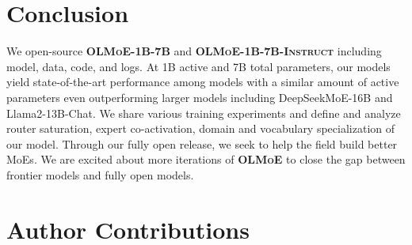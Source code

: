 \documentclass{article}
\newcommand{\model}{\textbf{\textsc{OLMoE}}}
\newcommand{\modelsmall}{\textbf{\textsc{OLMoE-1B-7B}}}
\newcommand{\modelsmalldpo}{\textbf{\textsc{OLMoE-1B-7B-Instruct}}}
\begin{document}
\section{Conclusion}

We open-source \modelsmall{} and \modelsmalldpo{} including model, data, code, and logs. At 1B active and 7B total parameters, our models yield state-of-the-art performance among models with a similar amount of active parameters even outperforming larger models including DeepSeekMoE-16B and Llama2-13B-Chat. We share various training experiments and define and analyze router saturation, expert co-activation, domain and vocabulary specialization of our model. Through our fully open release, we seek to help the field build better MoEs. We are excited about more iterations of \model{} to close the gap between frontier models and fully open models.

\section*{Author Contributions}
\label{sec:contribute}
\end{document}
